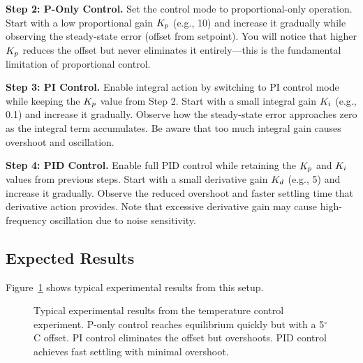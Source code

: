 \textbf{Step 2: P-Only Control.}
Set the control mode to proportional-only operation. Start with a low proportional gain $K_p$ (e.g., 10) and increase it gradually while observing the steady-state error (offset from setpoint). You will notice that higher $K_p$ reduces the offset but never eliminates it entirely---this is the fundamental limitation of proportional control.

\textbf{Step 3: PI Control.}
Enable integral action by switching to PI control mode while keeping the $K_p$ value from Step 2. Start with a small integral gain $K_i$ (e.g., 0.1) and increase it gradually. Observe how the steady-state error approaches zero as the integral term accumulates. Be aware that too much integral gain causes overshoot and oscillation.

\textbf{Step 4: PID Control.}
Enable full PID control while retaining the $K_p$ and $K_i$ values from previous steps. Start with a small derivative gain $K_d$ (e.g., 5) and increase it gradually. Observe the reduced overshoot and faster settling time that derivative action provides. Note that excessive derivative gain may cause high-frequency oscillation due to noise sensitivity.

\subsection{Expected Results}

Figure~\ref{fig:experimental_results} shows typical experimental results from this setup.

\begin{figure}[htbp]
\centering
{}
\caption{Typical experimental results from the temperature control experiment. P-only control reaches equilibrium quickly but with a 5$^\circ$C offset. PI control eliminates the offset but overshoots. PID control achieves fast settling with minimal overshoot.}
\label{fig:experimental_results}
\end{figure}


